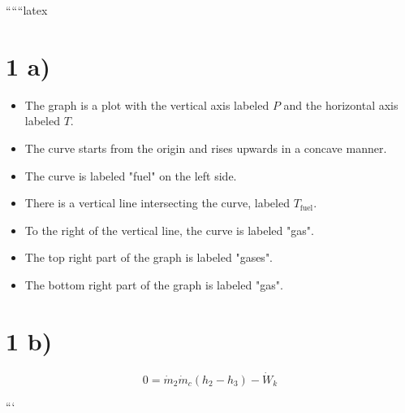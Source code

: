 
``````latex


\section*{1 a)}

\begin{itemize}
    \item The graph is a plot with the vertical axis labeled \( P \) and the horizontal axis labeled \( T \).
    \item The curve starts from the origin and rises upwards in a concave manner.
    \item The curve is labeled "fuel" on the left side.
    \item There is a vertical line intersecting the curve, labeled \( T_{\text{fuel}} \).
    \item To the right of the vertical line, the curve is labeled "gas".
    \item The top right part of the graph is labeled "gases".
    \item The bottom right part of the graph is labeled "gas".
\end{itemize}

\section*{1 b)}

\[
0 = \dot{m}_2 \dot{m}_c \left( h_2 - h_3 \right) - \dot{W}_k
\]

```